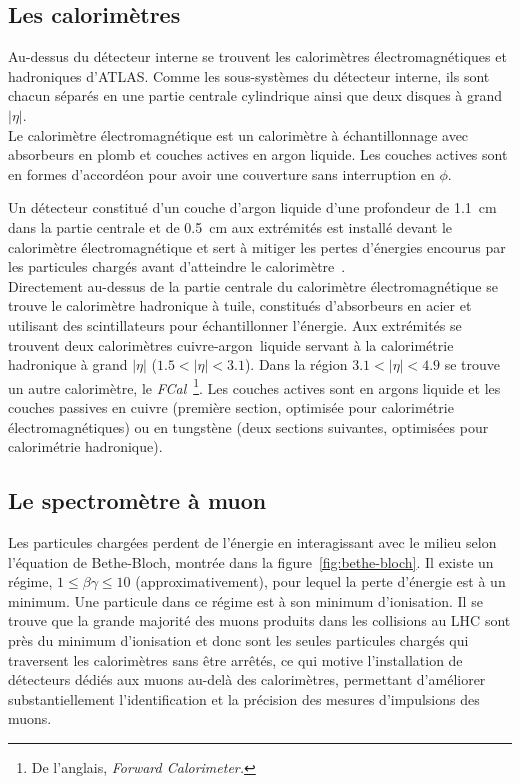 \subsection{Les calorimètres}
\label{sec:lhc_atlas:atlas:calo}

Au-dessus du détecteur interne se trouvent les calorimètres
électromagnétiques et hadroniques d'ATLAS. Comme les sous-systèmes du
détecteur interne, ils sont chacun séparés en une partie centrale
cylindrique ainsi que deux disques à grand $|\eta|$. \\

Le calorimètre électromagnétique est un calorimètre à échantillonnage
avec absorbeurs en plomb et couches actives en argon liquide. Les
couches actives sont en formes d'accordéon pour avoir une couverture
sans interruption en $\phi$. 

Un détecteur constitué d'un couche
d'argon liquide d'une profondeur de 1.1~cm dans la partie centrale et
de 0.5~cm aux extrémités est installé devant le calorimètre
électromagnétique et sert à mitiger les pertes d'énergies encourus par
les particules chargés avant d'atteindre le
calorimètre~\cite{andrieux_construction_2002}. \\

Directement au-dessus de la partie centrale du calorimètre
électromagnétique se trouve le calorimètre hadronique à tuile,
constitués d'absorbeurs en acier et utilisant des scintillateurs pour
échantillonner l'énergie. Aux extrémités se trouvent deux calorimètres
cuivre-argon~liquide servant à la calorimétrie hadronique à grand
$|\eta|$ ($1.5 < |\eta| < 3.1$). Dans la région $3.1 < |\eta| < 4.9$
se trouve un autre calorimètre, le \emph{FCal}~\footnote{De l'anglais,
  \emph{Forward Calorimeter.}}. Les couches actives sont en argons
liquide et les couches passives en cuivre (première section, optimisée
pour calorimétrie électromagnétiques) ou en tungstène (deux sections
suivantes, optimisées pour calorimétrie hadronique).

\subsection{Le spectromètre à muon}
\label{sec:lhc_atlas:atlas:mu}

Les particules chargées perdent de l'énergie en interagissant avec le
milieu selon l'équation de Bethe-Bloch, montrée dans la
figure~\ref{fig:bethe-bloch}. Il existe un régime,
$1 \le\beta\gamma\le 10$ (approximativement), pour lequel la perte
d'énergie est à un minimum. Une particule dans ce régime est à son
minimum d'ionisation. Il se trouve que la grande majorité des muons
produits dans les collisions au LHC sont près du minimum d'ionisation
et donc sont les seules particules chargés qui traversent les
calorimètres sans être arrêtés, ce qui motive l'installation de
détecteurs dédiés aux muons au-delà des calorimètres, permettant
d'améliorer substantiellement l'identification et la précision des
mesures d'impulsions des muons.

